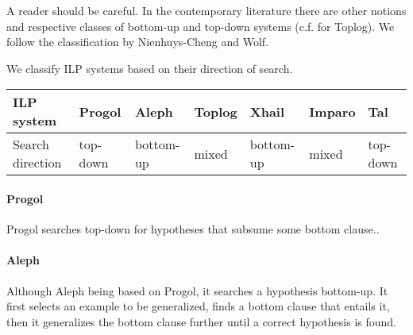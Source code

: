 \begin{remark}
A reader should be careful. In the contemporary literature there are other notions and respective classes of bottom-up and top-down systems (c.f.\cite{corapi2010inductive} for Toplog). We follow the classification by Nienhuys-Cheng and Wolf\cite{nienhuys1997foundations}.
\end{remark}

We classify ILP systems based on their direction of search.

\begin{center}
\label{tab:title} 
\begin{tabular}{| l | l | l | l | l | l | l |}
    \hline
    ILP system & Progol & Aleph & Toplog & Xhail & Imparo & Tal \\ \hline
   	Search direction & top-down & bottom-up& mixed & bottom-up & mixed & top-down\\ \hline
\end{tabular}
\end{center}

\begin{center}
\end{center}

\paragraph{Progol}
Progol searches top-down for hypotheses that subsume some bottom clause.\cite{nienhuys1997foundations}.
\paragraph{Aleph\cite{aleph2007}}
Although Aleph being based on Progol, it searches a hypothesis bottom-up. It first selects an example to be generalized, finds a bottom clause that entails it, then it generalizes the bottom clause further until a correct hypothesis is found.
